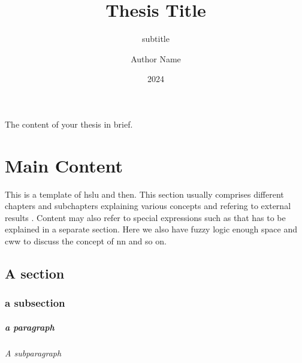 \documentclass[12pt, a4paper, oneside]{book}   	%
\author{Author Name}                            %
\title{Thesis Title}                            %
\subtitle{\large subtitle}                      %
\date{2024}                                     %
\begin{document}
\english                                        %
\maketitle


\begin{abstractstyle}{\hsummary}
    The content of your thesis in brief.
\end{abstractstyle}

\tableofcontents
\listoffigures
\listoftables
\printnoidxglossaries



\mainmatter

\chapter{Main Content}
This is a template of \gls{hslu} and then. This section usually comprises different chapters and subchapters explaining various concepts and refering to external results \cite{christen_exogenous_2020}.
Content may also refer to special expressions such as that has to be explained in a separate section. Here we also have \gls{fuzzy logic} enough space and \gls{cww} to discuss the concept of \gls{nn} and so on.

\section{A section}
\subsection{a subsection}
\paragraph{a paragraph}
\subparagraph{A subparagraph}

\begin{comment}
    This is a sample comment.
\end{comment}


\footnotesize



\appendix

\glsaddallunused                                %
\end{document}
